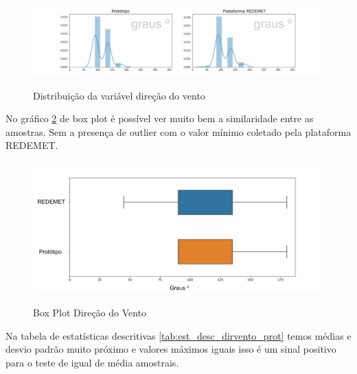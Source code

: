 \begin{figure} [!h]
    \centering
    \caption{Distribuição da variável direção do vento}    
    \includegraphics [scale = 0.5] {Figuras/dist_dirvento.png}
    \label{fig:dist_dirvento}
\end{figure}

No gráfico \ref{fig:box_plot_dirvento} de box plot é possível ver muito bem a similaridade entre as amostras. Sem a presença de outlier com o valor mínimo coletado pela plataforma REDEMET. 

\begin{figure} [!h]
    \centering
    \caption{Box Plot Direção do Vento}
    \includegraphics [scale = 0.5] {Figuras/box_plot_dirvento.png}
    \label{fig:box_plot_dirvento}
\end{figure}

Na tabela de estatísticas descritivas \ref{tab:est_desc_dirvento_prot} temos médias e desvio padrão muito próximo e valores máximos iguais isso é um sinal positivo para o teste de igual de média amostrais.

